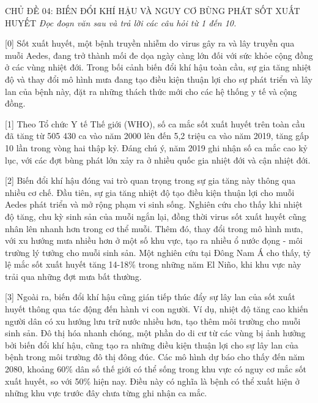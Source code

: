 \documentclass[12pt,a4paper,twoside]{article}
\newenvironment{readingpassage}[1][]{%
    \begin{tcolorbox}[enhanced, colback=grayLight, colframe=secondaryBlue,
        coltitle=textDark, fonttitle=\bfseries, title={#1},
        rounded corners, arc=3mm, boxrule=1pt,
        left=15pt, right=15pt, top=10pt, bottom=10pt,
        breakable, before skip=10pt, after skip=10pt, drop fuzzy shadow]
    \setstretch{1.3}
}{\end{tcolorbox}}
\begin{document}
\newpage
\label{a_cd04}
\begin{topicbox}{\large CHỦ ĐỀ 04: BIẾN ĐỔI KHÍ HẬU VÀ NGUY CƠ BÙNG PHÁT SỐT XUẤT HUYẾT}
\vspace{8pt}
\textit{Đọc đoạn văn sau và trả lời các câu hỏi từ 1 đến 10.}
\vspace{6pt}
\end{topicbox}
\vspace{5pt}
\begin{readingpassage}[]
[0] Sốt xuất huyết, một bệnh truyền nhiễm do virus gây ra và lây truyền qua muỗi Aedes, đang trở thành mối đe dọa ngày càng lớn đối với sức khỏe cộng đồng ở các vùng nhiệt đới. Trong bối cảnh biến đổi khí hậu toàn cầu, sự gia tăng nhiệt độ và thay đổi mô hình mưa đang tạo điều kiện thuận lợi cho sự phát triển và lây lan của bệnh này, đặt ra những thách thức mới cho các hệ thống y tế và cộng đồng.

[1] Theo Tổ chức Y tế Thế giới (WHO), số ca mắc sốt xuất huyết trên toàn cầu đã tăng từ 505 430 ca vào năm 2000 lên đến 5,2 triệu ca vào năm 2019, tăng gấp 10 lần trong vòng hai thập kỷ. Đáng chú ý, năm 2019 ghi nhận số ca mắc cao kỷ lục, với các đợt bùng phát lớn xảy ra ở nhiều quốc gia nhiệt đới và cận nhiệt đới.

[2] Biến đổi khí hậu đóng vai trò quan trọng trong sự gia tăng này thông qua nhiều cơ chế. Đầu tiên, sự gia tăng nhiệt độ tạo điều kiện thuận lợi cho muỗi Aedes phát triển và mở rộng phạm vi sinh sống. Nghiên cứu cho thấy khi nhiệt độ tăng, chu kỳ sinh sản của muỗi ngắn lại, đồng thời virus sốt xuất huyết cũng nhân lên nhanh hơn trong cơ thể muỗi. Thêm đó, thay đổi trong mô hình mưa, với xu hướng mưa nhiều hơn ở một số khu vực, tạo ra nhiều ổ nước đọng - môi trường lý tưởng cho muỗi sinh sản. Một nghiên cứu tại Đông Nam Á cho thấy, tỷ lệ mắc sốt xuất huyết tăng 14-18\% trong những năm El Niño, khi khu vực này trải qua những đợt mưa bất thường.

[3] Ngoài ra, biến đổi khí hậu cũng gián tiếp thúc đẩy sự lây lan của sốt xuất huyết thông qua tác động đến hành vi con người. Ví dụ, nhiệt độ tăng cao khiến người dân có xu hướng lưu trữ nước nhiều hơn, tạo thêm môi trường cho muỗi sinh sản. Đô thị hóa nhanh chóng, một phần do di cư từ các vùng bị ảnh hưởng bởi biến đổi khí hậu, cũng tạo ra những điều kiện thuận lợi cho sự lây lan của bệnh trong môi trường đô thị đông đúc. Các mô hình dự báo cho thấy đến năm 2080, khoảng 60\% dân số thế giới có thể sống trong khu vực có nguy cơ mắc sốt xuất huyết, so với 50\% hiện nay. Điều này có nghĩa là bệnh có thể xuất hiện ở những khu vực trước đây chưa từng ghi nhận ca mắc.


\end{readingpassage}
\end{document}
